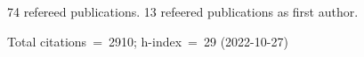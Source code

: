 74 refereed publications. 13 refeered publications as first author.

Total citations~=~2910; h-index~=~29 (2022-10-27)